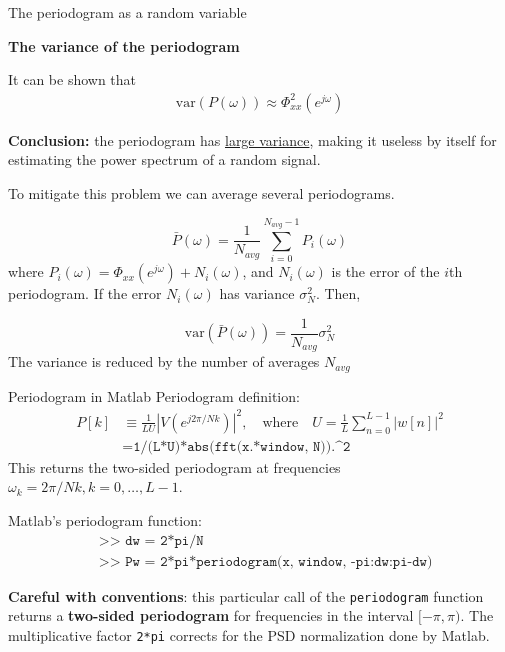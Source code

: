 \documentclass[10pt, aspectratio=169, handout]{beamer}
\begin{document}
\begin{frame}{The periodogram as a random variable}

\textbf{The variance of the periodogram}

It can be shown that
\begin{align*}
	\mathrm{var}(P(\omega)) \approx \Phi_{xx}^2(e^{j\omega})
\end{align*}

\vspace{-0.25cm}
\textbf{Conclusion:} the periodogram has \underline{large variance}, making it useless by itself for estimating the power spectrum of a random signal.

\vspace{0.25cm}
To mitigate this problem we can average several periodograms. 

\begin{equation*}
\bar{P}(\omega) = \frac{1}{N_{avg}}\sum_{i = 0}^{N_{avg}-1} P_i(\omega)
\end{equation*}
where $P_i(\omega) = \Phi_{xx}(e^{j\omega}) + N_i(\omega)$, and $N_i(\omega)$ is the error of the $i$th periodogram. If the error $N_i(\omega)$ has variance $\sigma_N^2$. Then,

\begin{equation*}
	\mathrm{var}(\bar{P}(\omega)) = \frac{1}{N_{avg}}\sigma_N^2
\end{equation*}
The variance is reduced by the number of averages $N_{avg}$

\end{frame}

\begin{frame}{Periodogram in Matlab}
Periodogram definition:
\begin{align*}
P[k] &\equiv \frac{1}{LU}|V(e^{j2\pi/Nk})|^2, \quad\text{where}\quad U = \frac{1}{L}\sum_{n = 0}^{L-1}|w[n]|^2 \\
&= \texttt{1/(L*U)*abs(fft(x.*window, N)).\textasciicircum 2} \tag{Matlab code}
\end{align*}
This returns the two-sided periodogram at frequencies $\omega_k = 2\pi/Nk, k=0, \ldots, L-1$.

Matlab's periodogram function:
\begin{align*}
&\texttt{>> dw = 2*pi/N} \\
&\texttt{>> Pw = 2*pi*periodogram(x, window, -pi:dw:pi-dw)}
\end{align*}

\textbf{Careful with conventions}: this particular call of the \texttt{periodogram} function returns a \textbf{two-sided periodogram} for frequencies in the interval $[-\pi, \pi)$. The multiplicative factor \texttt{2*pi} corrects for the PSD normalization done by Matlab.
\end{frame}
\end{document}
